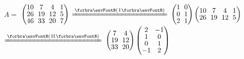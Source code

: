 \AExa $A={}$ {\normalsize$\begin{pmatrix} 10 &\hspace{-4pt} 7 &\hspace{-4pt} 4 &\hspace{-4pt} 1 \\[-2pt] 26 &\hspace{-4pt} 19 &\hspace{-4pt} 12 &\hspace{-4pt} 5\\[-2pt] 46 &\hspace{-4pt} 33 &\hspace{-4pt} 20 &\hspace{-4pt} 7\end{pmatrix}$
	{$\xlongequal{\SmallPar{\text{I}}}$}
	$\begin{pmatrix} 1 &\hspace{-4pt} 0\\[-2pt] 0 &\hspace{-4pt} 1\\[-2pt] 2 &\hspace{-4pt} 1\end{pmatrix}\begin{pmatrix} 10 &\hspace{-4pt} 7 &\hspace{-4pt} 4 &\hspace{-4pt} 1\\[-2pt] 26 &\hspace{-4pt} 19 &\hspace{-4pt} 12 &\hspace{-4pt} 5\end{pmatrix}$
	{$\xlongequal{\SmallPar{\text{II}}}$}
	$\begin{pmatrix} 7 &\hspace{-4pt} 4\\[-2pt] 19 &\hspace{-4pt} 12\\[-2pt] 33 &\hspace{-4pt} 20\end{pmatrix}\begin{pmatrix} 2 &\hspace{-4pt} -1\\[-2pt] 1 &\hspace{-4pt} 0\\[-2pt] 0 &\hspace{-4pt} 1\\[-2pt] -1 &\hspace{-4pt} 2\end{pmatrix}$}\par\quad
